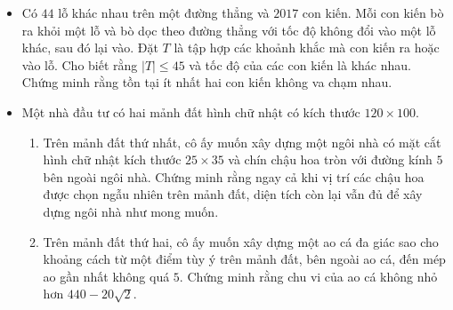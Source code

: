 \documentclass[11pt]{scrartcl}
\begin{document}
\begin{itemize}[label=, leftmargin=0em, itemsep=0.5em]
\begin{btvn}
    \end{btvn}

    \item \begin{btvn} Có $44$ lỗ khác nhau trên một đường thẳng và $2017$ con kiến. Mỗi con kiến bò ra khỏi một lỗ và bò dọc theo đường thẳng với tốc độ không đổi vào một lỗ khác, sau đó lại vào. Đặt $T$ là tập hợp các khoảnh khắc mà con kiến ra hoặc vào lỗ. Cho biết rằng $|T|\leq 45$ và tốc độ của các con kiến là khác nhau. Chứng minh rằng tồn tại ít nhất hai con kiến không va chạm nhau.
    \end{btvn}


    \item \begin{btvn}
        Một nhà đầu tư có hai mảnh đất hình chữ nhật có kích thước $120\times 100$.
        \begin{enumerate}[label=(\alph*)]
            \item Trên mảnh đất thứ nhất, cô ấy muốn xây dựng một ngôi nhà có mặt cắt hình chữ nhật kích thước $25\times 35$ và chín chậu hoa tròn với đường kính $5$ bên ngoài ngôi nhà. Chứng minh rằng ngay cả khi vị trí các chậu hoa được chọn ngẫu nhiên trên mảnh đất, diện tích còn lại vẫn đủ để xây dựng ngôi nhà như mong muốn.
            \item Trên mảnh đất thứ hai, cô ấy muốn xây dựng một ao cá đa giác sao cho khoảng cách từ một điểm tùy ý trên mảnh đất, bên ngoài ao cá, đến mép ao gần nhất không quá $5$. Chứng minh rằng chu vi của ao cá không nhỏ hơn $440-20\sqrt{2}$.
        \end{enumerate}
    \end{btvn}


\end{itemize}
\end{document}
